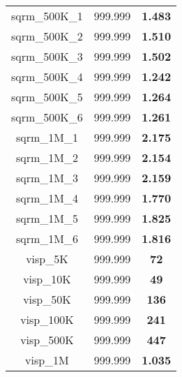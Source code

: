 \begin{tabular}{cc||c}
sqrm\_500K\_1      & 999.999          & {\bf 1.483}     \\ 
sqrm\_500K\_2      & 999.999          & {\bf 1.510}     \\ 
sqrm\_500K\_3      & 999.999          & {\bf 1.502}     \\ 
sqrm\_500K\_4      & 999.999          & {\bf 1.242}     \\ 
sqrm\_500K\_5      & 999.999          & {\bf 1.264}     \\ 
sqrm\_500K\_6      & 999.999          & {\bf 1.261}     \\ 
sqrm\_1M\_1        & 999.999          & {\bf 2.175}     \\ 
sqrm\_1M\_2        & 999.999          & {\bf 2.154}     \\ 
sqrm\_1M\_3        & 999.999          & {\bf 2.159}     \\ 
sqrm\_1M\_4        & 999.999          & {\bf 1.770}     \\ 
sqrm\_1M\_5        & 999.999          & {\bf 1.825}     \\ 
sqrm\_1M\_6        & 999.999          & {\bf 1.816}     \\ 
visp\_5K          & 999.999          & {\bf 72}        \\ 
visp\_10K         & 999.999          & {\bf 49}        \\ 
visp\_50K         & 999.999          & {\bf 136}       \\ 
visp\_100K        & 999.999          & {\bf 241}       \\ 
visp\_500K        & 999.999          & {\bf 447}       \\ 
visp\_1M          & 999.999          & {\bf 1.035}     \\ 
\end{tabular}